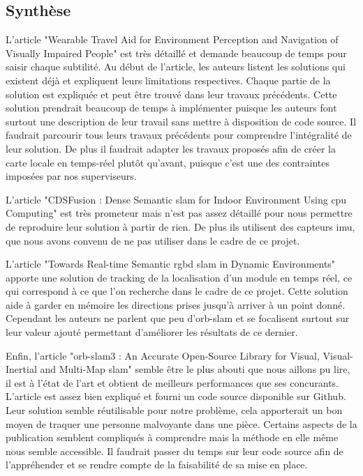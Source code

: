 \documentclass[11pt]{article}
\begin{document}
  \pagebreak

  \subsection{Synthèse}

  L'article "Wearable Travel Aid for Environment Perception and Navigation of Visually Impaired People" est très détaillé et demande beaucoup 
  de temps pour saisir chaque subtilité.
  Au début de l'article, les auteurs listent les solutions qui existent déjà et expliquent leurs limitations respectives. 
  Chaque partie de la solution est expliquée et peut être trouvé dans leur travaux précédents. Cette solution prendrait beaucoup de temps
  à implémenter puisque les auteurs font surtout une description de leur travail sans mettre à disposition de code source. 
  Il faudrait parcourir tous leurs travaux précédents pour comprendre l'intégralité de leur solution. De plus il faudrait adapter les travaux
  proposés afin de créer la carte locale en temps-réel plutôt qu'avant, puisque c'est une des contraintes imposées par nos superviseurs. 

  L'article "CDSFusion : Dense Semantic \acrshort{slam} for Indoor Environment Using \acrshort{cpu} Computing" est très prometeur mais n'est pas assez détaillé 
  pour nous permettre de reproduire leur solution à partir de rien. De plus ils utilisent des capteurs \acrshort{imu}, que nous avons convenu de ne pas 
  utiliser dans le cadre de ce projet.

  L'article "Towards Real-time Semantic \acrshort{rgbd} \acrshort{slam} in Dynamic Environments" apporte une solution de tracking de la localisation 
  d'un module en temps réel, ce qui correspond à ce que l'on recherche dans le cadre de ce projet. Cette solution aide à garder en 
  mémoire les directions prises jusqu'à arriver à un point donné. Cependant les auteurs ne parlent que peu d'\acrshort{orb}-\acrshort{slam} et se focalisent 
  surtout sur leur valeur ajouté permettant d'améliorer les résultats de ce dernier.

  Enfin, l'article "\acrshort{orb}-\acrshort{slam}3 : An Accurate Open-Source Library for Visual, Visual-Inertial and Multi-Map \acrshort{slam}" semble être le plus abouti
  que nous aillons pu lire, il est à l'état de l'art et obtient de meilleurs performances que ses concurants. L'article est assez bien expliqué
  et fourni un code source disponible sur Github. Leur solution semble réutilisable pour notre problème, cela apporterait un bon moyen
  de traquer une personne malvoyante dans une pièce. Certains aspects de la publication semblent compliqués à comprendre mais la méthode en 
  elle même nous semble accessible. Il faudrait passer du temps sur leur code source afin de l'appréhender et se rendre compte de la faisabilité
  de sa mise en place.
\end{document}
